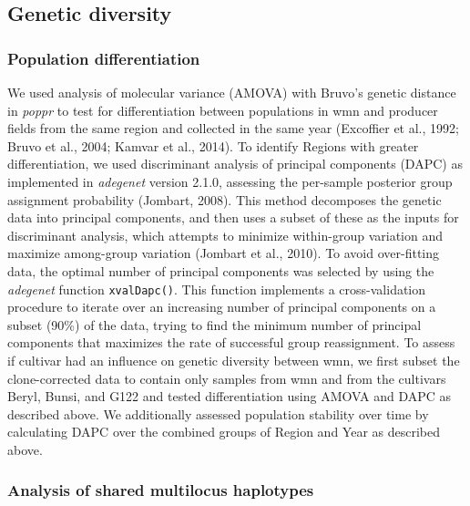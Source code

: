 \subsection*{Genetic diversity}\label{genetic-diversity}

\subsubsection*{Population
differentiation}\label{population-differentiation}

We used analysis of molecular variance (AMOVA) with Bruvo's genetic
distance in \emph{poppr} to test for differentiation between populations
in wmn and producer fields from the same region and collected in the
same year (Excoffier et al., 1992; Bruvo et al., 2004; Kamvar et al.,
2014). To identify Regions with greater differentiation, we used
discriminant analysis of principal components (DAPC) as implemented in
\emph{adegenet} version 2.1.0, assessing the per-sample posterior group
assignment probability (Jombart, 2008). This method decomposes the
genetic data into principal components, and then uses a subset of these
as the inputs for discriminant analysis, which attempts to minimize
within-group variation and maximize among-group variation (Jombart et
al., 2010). To avoid over-fitting data, the optimal number of principal
components was selected by using the \emph{adegenet} function
\texttt{xvalDapc()}. This function implements a cross-validation
procedure to iterate over an increasing number of principal components
on a subset (90\%) of the data, trying to find the minimum number of
principal components that maximizes the rate of successful group
reassignment. To assess if cultivar had an influence on genetic
diversity between wmn, we first subset the clone-corrected data to
contain only samples from wmn and from the cultivars Beryl, Bunsi, and
G122 and tested differentiation using AMOVA and DAPC as described above.
We additionally assessed population stability over time by calculating
DAPC over the combined groups of Region and Year as described above.

\subsubsection*{Analysis of shared multilocus
haplotypes}\label{analysis-of-shared-multilocus-haplotypes}

